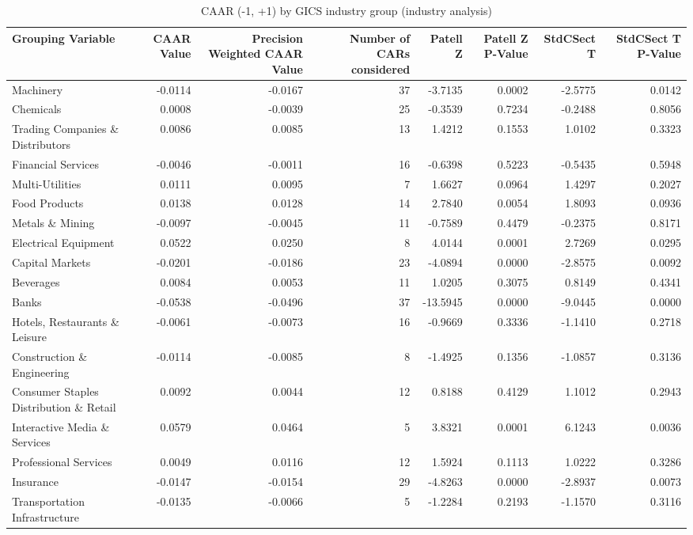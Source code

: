 \begin{table}
\caption{CAAR (-1, +1) by GICS industry group (industry analysis)}
\label{tab:industry_caar}
\begin{tabular}{lrrrrrrr}
\toprule
Grouping Variable & CAAR Value & Precision Weighted CAAR Value & Number of CARs considered & Patell Z & Patell Z P-Value & StdCSect T & StdCSect T P-Value \\
\midrule
Machinery & -0.0114 & -0.0167 & 37 & -3.7135 & 0.0002 & -2.5775 & 0.0142 \\
Chemicals & 0.0008 & -0.0039 & 25 & -0.3539 & 0.7234 & -0.2488 & 0.8056 \\
Trading Companies \& Distributors & 0.0086 & 0.0085 & 13 & 1.4212 & 0.1553 & 1.0102 & 0.3323 \\
Financial Services & -0.0046 & -0.0011 & 16 & -0.6398 & 0.5223 & -0.5435 & 0.5948 \\
Multi-Utilities & 0.0111 & 0.0095 & 7 & 1.6627 & 0.0964 & 1.4297 & 0.2027 \\
Food Products & 0.0138 & 0.0128 & 14 & 2.7840 & 0.0054 & 1.8093 & 0.0936 \\
Metals \& Mining & -0.0097 & -0.0045 & 11 & -0.7589 & 0.4479 & -0.2375 & 0.8171 \\
Electrical Equipment & 0.0522 & 0.0250 & 8 & 4.0144 & 0.0001 & 2.7269 & 0.0295 \\
Capital Markets & -0.0201 & -0.0186 & 23 & -4.0894 & 0.0000 & -2.8575 & 0.0092 \\
Beverages & 0.0084 & 0.0053 & 11 & 1.0205 & 0.3075 & 0.8149 & 0.4341 \\
Banks & -0.0538 & -0.0496 & 37 & -13.5945 & 0.0000 & -9.0445 & 0.0000 \\
Hotels, Restaurants \& Leisure & -0.0061 & -0.0073 & 16 & -0.9669 & 0.3336 & -1.1410 & 0.2718 \\
Construction \& Engineering & -0.0114 & -0.0085 & 8 & -1.4925 & 0.1356 & -1.0857 & 0.3136 \\
Consumer Staples Distribution \& Retail & 0.0092 & 0.0044 & 12 & 0.8188 & 0.4129 & 1.1012 & 0.2943 \\
Interactive Media \& Services & 0.0579 & 0.0464 & 5 & 3.8321 & 0.0001 & 6.1243 & 0.0036 \\
Professional Services & 0.0049 & 0.0116 & 12 & 1.5924 & 0.1113 & 1.0222 & 0.3286 \\
Insurance & -0.0147 & -0.0154 & 29 & -4.8263 & 0.0000 & -2.8937 & 0.0073 \\
Transportation Infrastructure & -0.0135 & -0.0066 & 5 & -1.2284 & 0.2193 & -1.1570 & 0.3116 \\

\end{tabular}
\end{table}
